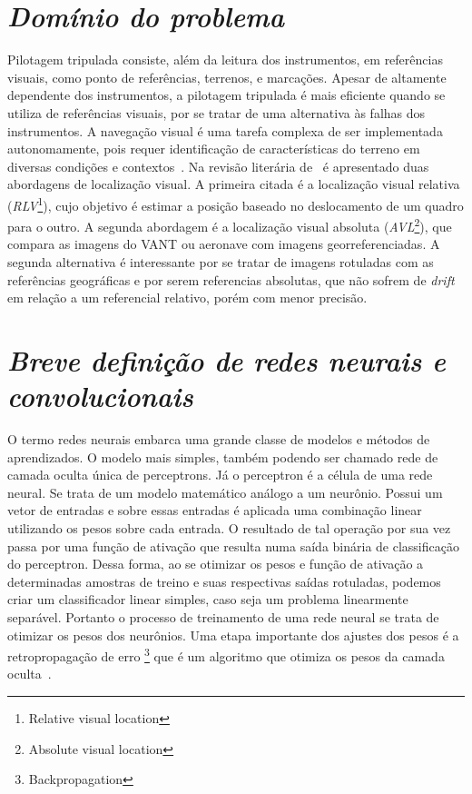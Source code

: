 

\section{\textit{Domínio do problema}}\label{sec:Cap2_dominio}

Pilotagem tripulada consiste, além da leitura dos instrumentos, em referências visuais, como ponto de referências, terrenos, e marcações. Apesar de altamente dependente dos instrumentos, a pilotagem tripulada é mais eficiente quando se utiliza de referências visuais, por se tratar de uma alternativa às falhas dos instrumentos. A navegação visual é uma tarefa complexa de ser implementada autonomamente, pois requer identificação de características do terreno em diversas condições e contextos~\cite{rs13194017}. Na revisão literária de~\cite{COUTURIER2021103666} é apresentado duas abordagens de localização visual. A primeira citada é a localização visual relativa (\textit{RLV}\footnote{Relative visual location}), cujo objetivo é estimar a posição baseado no deslocamento de um quadro para o outro. A segunda abordagem é a localização visual absoluta (\textit{AVL}\footnote{Absolute visual location}), que compara as imagens do VANT ou aeronave com imagens georreferenciadas. A segunda alternativa é interessante por se tratar de imagens rotuladas com as referências geográficas e por serem referencias absolutas, que não sofrem de \textit{drift} em relação a um referencial relativo, porém com menor precisão. 


\section{\textit{Breve definição de redes neurais e convolucionais}}\label{sec:Cap2_definicoes}

O termo redes neurais embarca uma grande classe de modelos e métodos de aprendizados. O modelo mais simples, também podendo ser chamado rede de camada oculta única de perceptrons. Já o  perceptron é a célula de uma rede neural. Se trata de um modelo matemático análogo a um neurônio. Possui um vetor de entradas e sobre essas entradas é aplicada uma combinação linear utilizando os pesos sobre cada entrada. O resultado de tal operação por sua vez passa por uma função de ativação que resulta numa saída binária de classificação do perceptron. Dessa forma, ao se otimizar os pesos e função de ativação a determinadas amostras de treino e suas respectivas saídas rotuladas, podemos criar um classificador linear simples, caso seja um problema linearmente separável. Portanto o processo de treinamento de uma rede neural se trata de otimizar os pesos dos neurônios. Uma etapa importante dos ajustes dos pesos é a retropropagação de erro \footnote{Backpropagation} que é um algoritmo que otimiza os pesos da camada oculta~\cite{hastie01statisticallearning}. 

